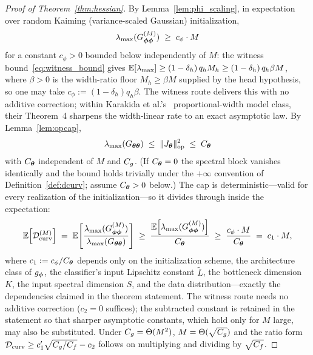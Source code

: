 \begin{proof}[Proof of Theorem~\ref{thm:hessian}]
By Lemma~\ref{lem:phi_scaling}, in expectation over random Kaiming
(variance-scaled Gaussian) initialization,
\[
    \lambda_{\max}(G^{(M)}_{{\boldsymbol{\phi}}{\boldsymbol{\phi}}}) \;\geq\; c_\phi \cdot M
\]
for a constant $c_\phi > 0$ bounded below independently of $M$: the witness
bound~\eqref{eq:witness_bound} gives
$\mathbb{E}[\lambda_{\max}] \geq (1 - \delta_h)\, q_h M_h \geq
(1 - \delta_h)\, q_h \beta M$, where $\beta > 0$ is the width-ratio floor
$M_h \geq \beta M$ supplied by the head hypothesis, so one may take
$c_\phi := (1 - \delta_h) q_h \beta$. The witness route delivers this with
no additive correction; within Karakida et
al.'s~\citep{karakida2019universal} proportional-width model class, their
Theorem~4 sharpens the width-linear rate to an exact asymptotic law. By
Lemma~\ref{lem:opcap},
\[
    \lambda_{\max}(G_{{\boldsymbol{\theta}}{\boldsymbol{\theta}}})
    \;\leq\; \|J_{\boldsymbol{\theta}}\|_{\mathrm{op}}^2 \;\leq\; C_{\boldsymbol{\theta}}
\]
with $C_{\boldsymbol{\theta}}$ independent of $M$ and $C_g$. (If $C_{\boldsymbol{\theta}} = 0$ the
spectral block vanishes identically and the bound holds trivially under the
$+\infty$ convention of Definition~\ref{def:dcurv}; assume $C_{\boldsymbol{\theta}} > 0$
below.) The cap is deterministic---valid for every realization of the
initialization---so it divides through inside the expectation:
\begin{equation}
    \mathbb{E}\!\left[\mathcal{D}_{\mathrm{curv}}^{(M)}\right]
    \;=\; \mathbb{E}\!\left[\frac{\lambda_{\max}(G^{(M)}_{{\boldsymbol{\phi}}{\boldsymbol{\phi}}})}
                {\lambda_{\max}(G_{{\boldsymbol{\theta}}{\boldsymbol{\theta}}})}\right]
    \;\geq\; \frac{\mathbb{E}\!\left[\lambda_{\max}(G^{(M)}_{{\boldsymbol{\phi}}{\boldsymbol{\phi}}})\right]}
                  {C_{\boldsymbol{\theta}}}
    \;\geq\; \frac{c_\phi \cdot M}{C_{\boldsymbol{\theta}}}
    \;=\; c_1 \cdot M,
    \label{eq:disparity_bound}
\end{equation}
where $c_1 := c_\phi / C_{\boldsymbol{\theta}}$ depends only on the initialization scheme,
the architecture class of $g_{\boldsymbol{\phi}}$, the classifier's input Lipschitz
constant $\widetilde{L}$, the bottleneck dimension $K$, the input spectral
dimension $S$, and the data distribution---exactly the dependencies claimed
in the theorem statement. The witness route needs no additive correction
($c_2 = 0$ suffices); the subtracted constant is retained in the statement
so that sharper asymptotic constants, which hold only for $M$ large, may
also be substituted. Under $C_g = \Theta(M^2)$, $M = \Theta(\sqrt{C_g})$ and
the ratio form $\mathcal{D}_{\mathrm{curv}} \geq c_1' \sqrt{C_g / C_f} - c_2$ follows on
multiplying and dividing by $\sqrt{C_f}$.
\end{proof}

